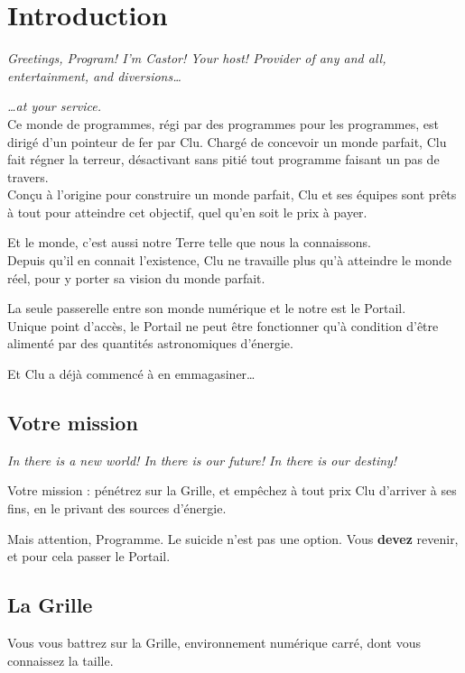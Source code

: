 \section{Introduction}
\emph{Greetings, Program! I'm Castor! Your host! Provider of any and
  all, entertainment, and diversions\ldots{}}

\emph{\ldots{}at your service.}\\

Ce monde de programmes, régi par des programmes pour les programmes,
est dirigé d'un pointeur de fer par Clu. Chargé de concevoir un monde
parfait, Clu fait régner la terreur, désactivant sans pitié tout programme
faisant un pas de travers.\\

Conçu à l'origine pour construire un monde parfait, Clu et ses équipes
sont prêts à tout pour atteindre cet objectif, quel qu'en soit le prix
à payer.

Et le monde, c'est aussi notre Terre telle que nous la connaissons.\\

Depuis qu'il en connait l'existence, Clu ne travaille plus qu'à
atteindre le monde réel, pour y porter sa vision du monde parfait.

La seule passerelle entre son monde numérique et le notre est le
Portail.\\

Unique point d'accès, le Portail ne peut être fonctionner qu'à
condition d'être alimenté par des quantités astronomiques d'énergie.

Et Clu a déjà commencé à en emmagasiner\ldots{}\\

        \subsection{Votre mission}
        \emph{In there is a new world! In there is our future! In
          there is our destiny!}

Votre mission : pénétrez sur la Grille, et empêchez à tout prix Clu
d'arriver à ses fins, en le privant des sources d'énergie.

Mais attention, Programme. Le suicide n'est pas une option. Vous
\textbf{devez} revenir, et pour cela passer le Portail.

\subsection{La Grille}
Vous vous battrez sur la Grille, environnement numérique carré, dont vous
connaissez la taille.

